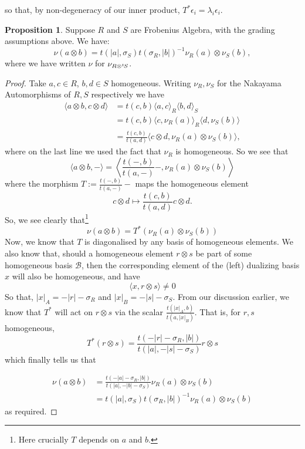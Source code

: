 \documentclass{article}
\newcommand{\twisten}{\otimes^t\hspace{-1pt}}
\theoremstyle{plain}
\theoremstyle{definition}
\newtheorem{proposition}[theorem]{Proposition}
\begin{document}
so that, by non-degeneracy of our inner product, $T^*\epsilon_i = \lambda_i \epsilon_i$. 
\begin{proposition} Suppose $R$ and $S$ are Frobenius Algebra, with the grading assumptions above. We have:
$$\nu(a \otimes b) = t(|a|, \sigma_S)t(\sigma_R, |b|)^{-1} \nu_R(a) \otimes \nu_S(b),$$
where we have written $\nu$ for $\nu_{R\twisten S}$.
\end{proposition}
\begin{proof}
Take $a, c \in R$, $b,d \in S$ homogeneous. Writing $\nu_R, \nu_S$ for the Nakayama Automorphisms of $R,S$ respectively we have
\begin{align*}
\langle a \otimes b, c \otimes d\rangle &= t(c,b) \langle a ,c \rangle_R \langle b,d \rangle_S \\
&=t(c,b) \langle c, \nu_R(a) \rangle_R \langle d, \nu_S(b) \rangle \\
&= \frac{t(c,b)}{t(a, d)} \langle c\otimes d, \nu_R(a) \otimes \nu_S(b) \rangle,
\end{align*}
where on the last line we used the fact that $\nu_R$ is homogeneous. So we see that
$$\langle a \otimes b , -  \rangle = \left\langle\frac{t(-,b)}{t(a, -)} -, \nu_R(a) \otimes \nu_S(b)\right\rangle$$
where the morphism $T:=\frac{t(-,b)}{t(a, -)}-$ maps the homogeneous element 
$$ c \otimes d \mapsto \frac{t(c,b)}{t(a,d)} c \otimes d.$$
So, we see clearly that\footnote{Here crucially $T$ depends on $a$ and $b$.}
$$\nu (a\otimes b) = T^* (\nu_R(a) \otimes \nu_S(b))$$
Now, we know that $T$ is diagonalised by any basis of homogeneous elements. We also know that, should a homogeneous element $r \otimes s$ be part of some homogeneous basis $\mathcal{B}$, then the corresponding element of the (left) dualizing basis $x$ will also be homogeneous, and have
$$ \langle x, r\otimes s \rangle \not =0$$
So that, $|x|_A = -|r| -\sigma_R$ and $|x|_B =-|s| - \sigma_S$. From our discussion earlier, we know that $T^*$ will act on $r\otimes s$ via the scalar $\frac{t(|x|_A,b)}{t(a,|x|_B)}$. That is, for $r, s$ homogeneous,
$$T^*( r \otimes s) = \frac{t(-|r|-\sigma_R, |b|)}{t(|a|, -|s|-\sigma_S)} r \otimes s$$
which finally tells us that

\begin{align*}
\nu(a \otimes b) &= \frac{t(-|a|-\sigma_R, |b|)}{t(|a|, -|b|-\sigma_S)} \nu_R(a) \otimes \nu_S(b) \\
&= t(|a|, \sigma_S)t(\sigma_R, |b|)^{-1} \nu_R(a) \otimes \nu_S(b)
\end{align*}
as required.
\end{proof}
\end{document}
